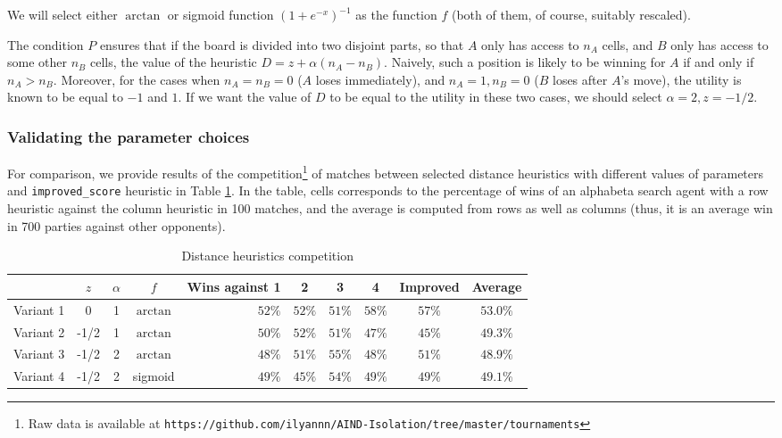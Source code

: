 \documentclass[oneside]{article}   	%
\begin{document}
We will select either $\arctan$ or sigmoid function $(1+e^{-x})^{-1}$ as the function $f$ (both of them, of course, suitably rescaled). 

The condition $P$ ensures that if the board is divided into two disjoint parts, so that $A$ only has access to $n_A$ cells, and $B$ only has access to some other $n_B$ cells, the value of the heuristic $D = z+\alpha(n_A-n_B)$. Naively, such a position is likely to be winning for $A$ if and only if $n_A > n_B$. Moreover, for the cases when $n_A=n_B=0$ ($A$ loses immediately), and $n_A=1, n_B=0$ ($B$ loses after $A$'s move), the utility is known to be equal to $-1$ and $1$. If we want the value of $D$ to be equal to the utility in these two cases, we should select $\alpha = 2, z = -1/2$.

\subsubsection{Validating the parameter choices}
\label{distancechoices}

For comparison, we provide results of the competition\footnote{Raw data is available at \texttt{https://github.com/ilyannn/AIND-Isolation/tree/master/tournaments}} of matches between selected distance heuristics with different values of parameters and \texttt{improved\_score} heuristic in Table \ref{DistanceCompetition}. In the table, cells corresponds to the percentage of wins of an alphabeta search agent with a row heuristic against the column heuristic in 100 matches, and the average is computed from rows as well as columns (thus, it is an average win in 700 parties against other opponents).

\begin{table}[htp]
\caption{Distance heuristics competition}
\begin{center}
\begin{tabular}{c|ccc|rcccc|c}
   & $z$ & $\alpha$ & $f$ & Wins against 1 & 2 & 3 & 4 & Improved & Average \\
   \hline
 Variant 1 &    0 & 1 & $\arctan$  & $52\%$ & $52\%$ & $51\%$ & $58\%$ & $57\%$ & $53.0\%$ \\
 Variant 2 & -1/2 & 1 & $\arctan$  & $50\%$ & $52\%$ & $51\%$ & $47\%$ & $45\%$ & $49.3\%$ \\
 Variant 3 & -1/2 & 2 & $\arctan$  & $48\%$ & $51\%$ & $55\%$ & $48\%$ & $51\%$ & $48.9\%$ \\
 Variant 4 & -1/2 & 2 & sigmoid    & $49\%$ & $45\%$ & $54\%$ & $49\%$ & $49\%$ & $49.1\%$
 
\end{tabular}
\end{center}
\label{DistanceCompetition}
\end{table}%
\end{document}
